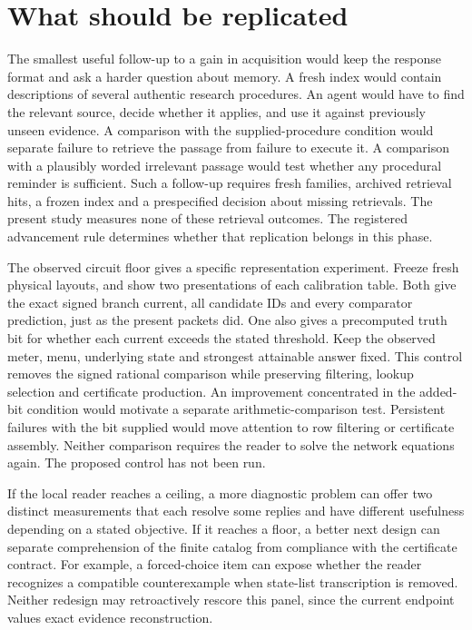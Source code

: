 \documentclass[12pt,letterpaper]{article}
\begin{document}
\section{What should be replicated}

The smallest useful follow-up to a gain in acquisition would keep the response format and ask a harder question about memory. A fresh index would contain descriptions of several authentic research procedures. An agent would have to find the relevant source, decide whether it applies, and use it against previously unseen evidence. A comparison with the supplied-procedure condition would separate failure to retrieve the passage from failure to execute it. A comparison with a plausibly worded irrelevant passage would test whether any procedural reminder is sufficient. Such a follow-up requires fresh families, archived retrieval hits, a frozen index and a prespecified decision about missing retrievals. The present study measures none of these retrieval outcomes. The registered advancement rule determines whether that replication belongs in this phase.

The observed circuit floor gives a specific representation experiment. Freeze fresh physical layouts, and show two presentations of each calibration table. Both give the exact signed branch current, all candidate IDs and every comparator prediction, just as the present packets did. One also gives a precomputed truth bit for whether each current exceeds the stated threshold. Keep the observed meter, menu, underlying state and strongest attainable answer fixed. This control removes the signed rational comparison while preserving filtering, lookup selection and certificate production. An improvement concentrated in the added-bit condition would motivate a separate arithmetic-comparison test. Persistent failures with the bit supplied would move attention to row filtering or certificate assembly. Neither comparison requires the reader to solve the network equations again. The proposed control has not been run.

If the local reader reaches a ceiling, a more diagnostic problem can offer two distinct measurements that each resolve some replies and have different usefulness depending on a stated objective. If it reaches a floor, a better next design can separate comprehension of the finite catalog from compliance with the certificate contract. For example, a forced-choice item can expose whether the reader recognizes a compatible counterexample when state-list transcription is removed. Neither redesign may retroactively rescore this panel, since the current endpoint values exact evidence reconstruction.
\end{document}
